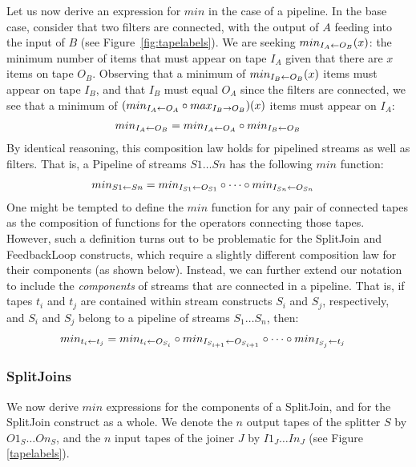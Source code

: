 Let us now derive an expression for $min$ in the case of a pipeline.
In the base case, consider that two filters are connected, with the
output of $A$ feeding into the input of $B$ (see
Figure~\ref{fig:tapelabels}).  We are seeking $min_{I_A \leftarrow O_B}(x)$: the
minimum number of items that must appear on tape $I_A$ given that
there are $x$ items on tape $O_B$.  Observing that a minimum of
$min_{I_B \leftarrow O_B}(x)$ items must appear on tape $I_B$, and that $I_B$
must equal $O_A$ since the filters are connected, we see that a
minimum of $(min_{I_A \leftarrow O_A} \circ max_{I_B \rightarrow O_B})(x)$ items must appear
on $I_A$:
\begin{align*}
min_{I_A \leftarrow O_B} = min_{I_A \leftarrow O_A} \circ min_{I_B \leftarrow O_B}
\end{align*}
By identical reasoning, this composition law holds for pipelined
streams as well as filters.  That is, a Pipeline of streams $S1 \dots
Sn$ has the following $min$ function:
\begin{align}
\label{eq:composepipe}
min_{S1 \leftarrow Sn} &= min_{I_{S1} \leftarrow O_{S1}} \circ \dots \circ min_{I_{Sn} \leftarrow O_{Sn}}
\end{align}
One might be tempted to define the $min$ function for any pair of
connected tapes as the composition of functions for the operators
connecting those tapes.  However, such a definition turns out to be
problematic for the SplitJoin and FeedbackLoop constructs, which
require a slightly different composition law for their components (as
shown below).  Instead, we can further extend our notation to include
the {\it components} of streams that are connected in a pipeline.
That is, if tapes $t_i$ and $t_j$ are contained within stream
constructs $S_i$ and $S_j$, respectively, and $S_i$ and $S_j$ belong
to a pipeline of streams $S_1 \dots S_n$, then:
\begin{align}
\label{eq:composetape}
min_{t_i \leftarrow t_j} &= min_{t_i \leftarrow O_{S_i}} \circ min_{I_{S_{i+1}} \leftarrow O_{S_{i+1}}}
\circ \dots \circ min_{I_{S_j} \leftarrow t_j}
\end{align}

\subsubsection{SplitJoins}
\label{sec:timesj}

We now derive $min$ expressions for the components of a SplitJoin, and
for the SplitJoin construct as a whole.  We denote the $n$ output
tapes of the splitter $S$ by $O1_S \dots On_S$, and the $n$ input
tapes of the joiner $J$ by $I1_J \dots In_J$ (see Figure
\ref{tapelabels}).

